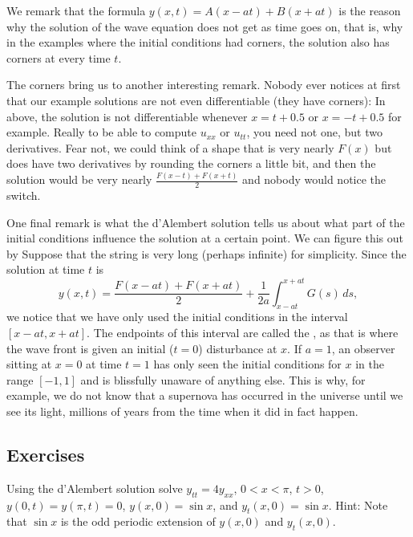 We remark that the formula $y(x,t) = A(x-at) + B(x+at)$ is the reason
why the solution of the wave equation does not get  as time
goes on, that is, why in the examples where the initial conditions
had corners, the solution also has corners at every time $t$.

\medskip

The corners bring us to another interesting remark.  Nobody ever notices at first
that our example solutions are not even differentiable (they have corners):
In  above, the solution is not
differentiable whenever $x=t+0.5$ or $x=-t+0.5$ for example.
Really to be able to compute $u_{xx}$ or $u_{tt}$, you need not one, but two
derivatives.  Fear not, we could think of a shape that is very nearly
$F(x)$ but does have two derivatives by rounding the corners a little bit,
and then the solution would be very nearly
$\frac{F(x-t)+F(x+t)}{2}$ and nobody would notice the switch.

\medskip

One final remark is what the d'Alembert solution tells us about what
part of the initial conditions influence the solution at a certain point.
We can figure this out by   Suppose that the string is very long (perhaps
infinite) for simplicity.  Since the solution at time $t$ is
\begin{equation*}
y(x,t) =
\frac{F(x-at) + F(x+at)}{2} + \frac{1}{2a} \int_{x-at}^{x+at} G(s) \,ds ,
\end{equation*}
we notice that we have only used the initial conditions in the interval
$[x-at,x+at]$.  The endpoints of this interval are called the
\emph{}, as that is where the wave front is given an
initial ($t=0$) disturbance at $x$.
If $a=1$, an observer sitting at $x=0$ at time $t=1$ has only seen the
initial conditions for $x$ in the range $[-1,1]$
and is blissfully unaware of anything else.
This is why, for example, we do not know that a supernova has occurred in the
universe until we see its light, millions of years from the time
when it did in fact happen.

\subsection{Exercises}

\begin{exercise}
Using the d'Alembert solution solve $y_{tt} = 4y_{xx}$, $0 < x < \pi$, $t >
0$,
$y(0,t) = y(\pi, t) = 0$, $y(x,0) = \sin x$, and
$y_t(x,0) = \sin x$.  Hint: Note that $\sin x$ is the odd periodic extension of
$y(x,0)$ and $y_t(x,0)$.
\end{exercise}

